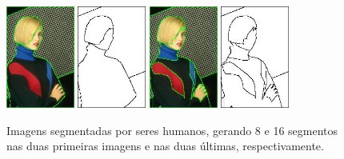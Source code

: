\begin{figure}[!htb]
 \centering
 \def\baselinestretch{1}\small\normalsize
 \includegraphics[width=0.2\textwidth]{img/198023-8-color.jpg}\qquad
 \includegraphics[width=0.2\textwidth]{img/198023-8.jpg}  \qquad
  \includegraphics[width=0.2\textwidth]{img/198023-16-color.jpg}  \qquad
 \includegraphics[width=0.2\textwidth]{img/198023-16.jpg}        
 \caption{\label{fig:Berkeley_mulher_segmentada}Imagens segmentadas por seres humanos, gerando 8 e 16 segmentos nas duas primeiras imagens e nas duas últimas, respectivamente. \citep{Arbelez2011}}
\end{figure}


